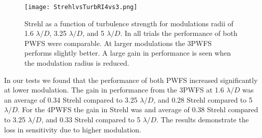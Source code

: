 \begin{figure}
    \centering
    \texttt{[image: StrehlvsTurbRI4vs3.png]}
    \caption{ Strehl as a function of turbulence strength for modulations radii of 1.6 $\lambda/D$, 3.25 $\lambda/D$, and 5 $\lambda/D$. In all trials the performance of both PWFS were comparable.  At larger modulations the 3PWFS performs slightly better. A large gain in performance is seen when the modulation radius is reduced.}
    \label{fig:results}
\end{figure}

In our tests we found that the performance of both PWFS increased significantly at lower modulation. The gain in performance from the 3PWFS at 1.6 $\lambda/D$ was an average of 0.34 Strehl compared to 3.25 $\lambda/D$, and 0.28 Strehl compared to 5 $\lambda/D$. For the 4PWFS the gain in Strehl was and average of  0.38 Strehl compared to 3.25 $\lambda/D$, and 0.33 Strehl compared to 5 $\lambda/D$. The results demonstrate the loss in sensitivity due to higher modulation. 
